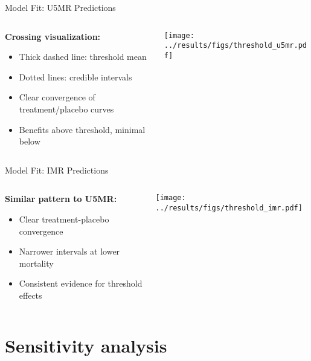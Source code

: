 \documentclass[aspectratio=169]{beamer}\usepackage[]{graphicx}\usepackage[dvipsnames]{xcolor}
\begin{document}
\begin{frame}{Model Fit: U5MR Predictions}
\begin{columns}
\begin{column}{0.35\textwidth}
\textbf{Crossing visualization:}
\begin{itemize}
  \item Thick dashed line: threshold mean
  \item Dotted lines: credible intervals
  \item Clear convergence of treatment/placebo curves
  \item Benefits above threshold, minimal below
\end{itemize}
\end{column}
\begin{column}{0.65\textwidth}
\begin{center}
\texttt{[image: ../results/figs/threshold\_u5mr.pdf]}
\end{center}
\end{column}
\end{columns}
\end{frame}

\begin{frame}{Model Fit: IMR Predictions}
\begin{columns}
\begin{column}{0.35\textwidth}
\textbf{Similar pattern to U5MR:}
\begin{itemize}
  \item Clear treatment-placebo convergence
  \item Narrower intervals at lower mortality
  \item Consistent evidence for threshold effects
\end{itemize}
\end{column}
\begin{column}{0.65\textwidth}
\begin{center}
\texttt{[image: ../results/figs/threshold\_imr.pdf]}
\end{center}
\end{column}
\end{columns}
\end{frame}

\section{Sensitivity analysis}
\end{document}
